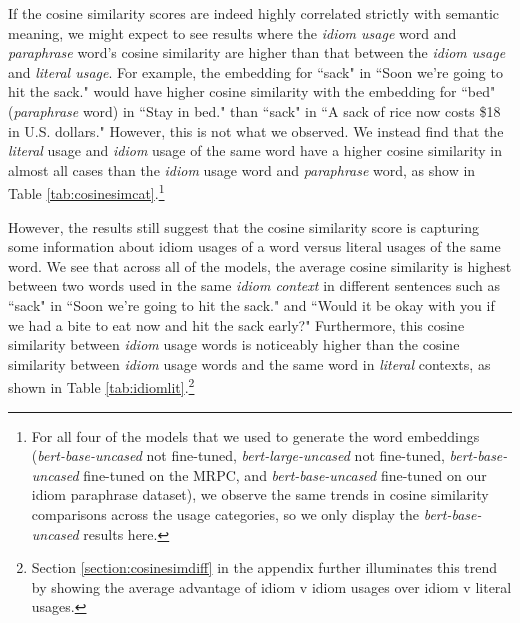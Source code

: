 \documentclass[11pt,a4paper]{article}
\begin{document}
If the cosine similarity scores are indeed highly correlated strictly with semantic meaning, we might expect to see results where the \textit{idiom usage} word and \textit{paraphrase} word's cosine similarity are higher than that between the \textit{idiom usage} and \textit{literal usage}. For example, the embedding for ``sack" in ``Soon we're going to hit the sack." would have higher cosine similarity with the embedding for ``bed" (\textit{paraphrase} word) in ``Stay in bed." than ``sack" in ``A sack of rice now costs \$18 in U.S. dollars." However, this is not what we observed. We instead find that the \textit{literal} usage and \textit{idiom} usage of the same word have a higher cosine similarity in almost all cases than the \textit{idiom} usage word and \textit{paraphrase} word, as show in Table \ref{tab:cosinesimcat}.\footnote{For all four of the models that we used to generate the word embeddings (\textit{bert-base-uncased} not fine-tuned, \textit{bert-large-uncased} not fine-tuned,  \textit{bert-base-uncased} fine-tuned on the MRPC, and \textit{bert-base-uncased} fine-tuned on our idiom paraphrase dataset), we observe the same trends in cosine similarity comparisons across the usage categories, so we only display the \textit{bert-base-uncased} results here.}


\begin{table}[htbp]
\caption{Cosine Similarity Category Comparisons}
\label{tab:cosinesimcat}
\begin{small}
\end{small}

\end{table}


However, the results still suggest that the cosine similarity score is capturing some information about idiom usages of a word versus literal usages of the same word. We see that across all of the models, the average cosine similarity is highest between two words used in the same \textit{idiom context} in different sentences such as ``sack"  in ``Soon we're going to hit the sack." and ``Would it be okay with you if we had a bite to eat now and hit the sack early?" Furthermore, this cosine similarity between \textit{idiom} usage words is noticeably higher than the cosine similarity between \textit{idiom} usage words and the same word in \textit{literal} contexts, as shown in Table \ref{tab:idiomlit}.\footnote{Section \ref{section:cosinesimdiff} in the appendix further illuminates this trend by showing the average advantage of idiom v idiom usages over idiom v literal usages.} 
\end{document}
